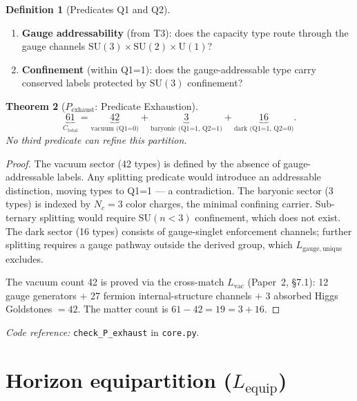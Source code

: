 \documentclass[11pt,a4paper]{article}
\newtheorem{theorem}{Theorem}[section]
\theoremstyle{definition}
\newtheorem{definition}[theorem]{Definition}
\newcommand{\SU}{\mathrm{SU}}
\newcommand{\U}{\mathrm{U}}
\newcommand{\coderef}[2]{\smallskip\noindent\textit{Code reference:} \texttt{#1} in \texttt{#2}.}
\begin{document}
\begin{definition}[Predicates Q1 and Q2]\label{def:Q1Q2}
\leavevmode
\begin{enumerate}[label=\textbf{Q\arabic*},nosep,leftmargin=3em]
  \item \textbf{Gauge addressability} (from T3): does the capacity type
  route through the gauge channels $\SU(3) \times \SU(2) \times \U(1)$?
  \item \textbf{Confinement} (within Q1=1): does the gauge-addressable
  type carry conserved labels protected by $\SU(3)$ confinement?
\end{enumerate}
\end{definition}

\begin{theorem}[$P_{\mathrm{exhaust}}$: Predicate Exhaustion]\label{thm:Pexhaust}
\[
  \underbrace{61}_{C_{\mathrm{total}}}
  = \underbrace{42}_{\text{vacuum (Q1=0)}}
  + \underbrace{3}_{\text{baryonic (Q1=1, Q2=1)}}
  + \underbrace{16}_{\text{dark (Q1=1, Q2=0)}}.
\]
No third predicate can refine this partition.
\end{theorem}

\begin{proof}
The vacuum sector (42 types) is defined by the absence of
gauge-addressable labels.  Any splitting predicate would introduce an
addressable distinction, moving types to Q1=1 --- a contradiction.
The baryonic sector (3 types) is indexed by $N_c = 3$ color charges,
the minimal confining carrier.  Sub-ternary splitting would require
$\SU(n < 3)$ confinement, which does not exist.  The dark sector
(16 types) consists of gauge-singlet enforcement channels; further
splitting requires a gauge pathway outside the derived group, which
$L_{\mathrm{gauge,unique}}$ excludes.

The vacuum count 42 is proved via the cross-match $L_{\mathrm{vac}}$
(Paper~2, \S7.1): 12 gauge generators $+$ 27 fermion
internal-structure channels $+$ 3 absorbed Higgs Goldstones $= 42$.
The matter count is $61 - 42 = 19 = 3 + 16$.
\end{proof}

\coderef{check\_P\_exhaust}{core.py}


\section{Horizon equipartition ($L_{\mathrm{equip}}$)}
\label{sec:equip}
\end{document}
